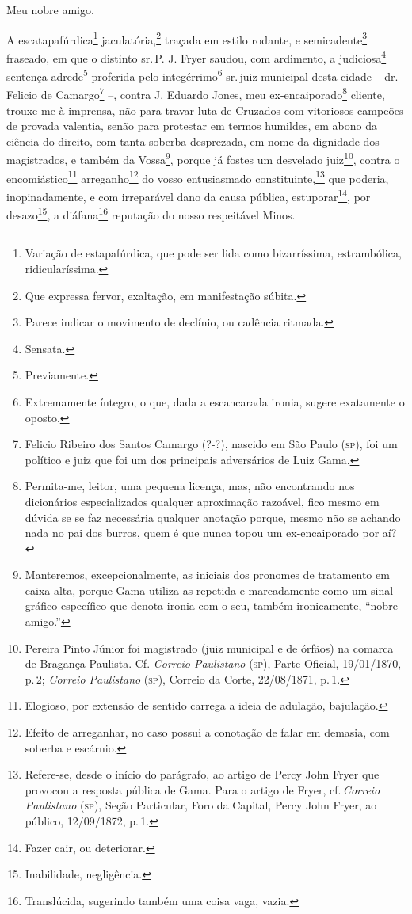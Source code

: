 Meu nobre amigo.

A escatapafúrdica\footnote{ Variação de estapafúrdica, que pode ser
  lida como bizarríssima, estrambólica, ridicularíssima.}
jaculatória,\footnote{ Que expressa fervor, exaltação, em manifestação
  súbita.} traçada em estilo rodante, e semicadente\footnote{ Parece
  indicar o movimento de declínio, ou cadência ritmada.} fraseado, em
que o distinto sr.\,P. J. Fryer saudou, com ardimento, a
judiciosa\footnote{ Sensata.} sentença adrede\footnote{ Previamente.}
proferida pelo integérrimo\footnote{ Extremamente íntegro, o que, dada
  a escancarada ironia, sugere exatamente o oposto.} sr.\,juiz municipal
desta cidade -- dr.\,Felicio de Camargo\footnote{ Felicio Ribeiro dos
  Santos Camargo (?-?), nascido em São Paulo (\textsc{sp}), foi um político e
  juiz que foi um dos principais adversários de Luiz Gama.} --, contra
J. Eduardo Jones, meu ex-encaiporado\footnote{ Permita-me, leitor, uma
  pequena licença, mas, não encontrando nos dicionários especializados
  qualquer aproximação razoável, fico mesmo em dúvida se se faz
  necessária qualquer anotação porque, mesmo não se achando nada no pai
  dos burros, quem é que nunca topou um ex-encaiporado por aí?} cliente,
trouxe-me à imprensa, não para travar luta de Cruzados com vitoriosos
campeões de provada valentia, senão para protestar em termos humildes,
em abono da ciência do direito, com tanta soberba desprezada, em nome da
dignidade dos magistrados, e também da Vossa\footnote{ Manteremos,
  excepcionalmente, as iniciais dos pronomes de tratamento em caixa
  alta, porque Gama utiliza-as repetida e marcadamente como um sinal
  gráfico específico que denota ironia com o seu, também ironicamente,
  ``nobre amigo.''}, porque já fostes um desvelado juiz\footnote{ Pereira
  Pinto Júnior foi magistrado (juiz municipal e de órfãos) na comarca de
  Bragança Paulista. Cf. \emph{Correio Paulistano} (\textsc{sp}), Parte Oficial,
  19/01/1870, p.\,2; \emph{Correio Paulistano} (\textsc{sp}), Correio da Corte,
  22/08/1871, p.\,1.}, contra o encomiástico\footnote{ Elogioso, por
  extensão de sentido carrega a ideia de adulação, bajulação.}
arreganho\footnote{ Efeito de arreganhar, no caso possui a conotação de
  falar em demasia, com soberba e escárnio.} do vosso entusiasmado
constituinte,\footnote{ Refere-se, desde o início do parágrafo, ao
  artigo de Percy John Fryer que provocou a resposta pública de Gama.
  Para o artigo de Fryer, cf.\,\emph{Correio Paulistano} (\textsc{sp}), Seção
  Particular, Foro da Capital, Percy John Fryer, ao público, 12/09/1872,
  p.\,1.} que poderia, inopinadamente, e com irreparável dano da causa
pública, estuporar\footnote{ Fazer cair, ou deteriorar.}, por
desazo\footnote{ Inabilidade, negligência.}, a diáfana\footnote{
  Translúcida, sugerindo também uma coisa vaga, vazia.} reputação do
nosso respeitável Minos.

